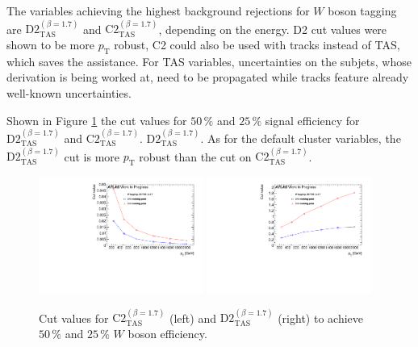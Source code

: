The variables achieving the highest background rejections for $W$ boson tagging are $\text{D2}_{\text{TAS}}^{(\beta=1.7)}$ and $\text{C2}_{\text{TAS}}^{(\beta=1.7)}$, depending on the energy. D2 cut values were shown to be more $p_{\mathrm{T}}$ robust, C2 could also be used with tracks instead of TAS, which saves the assistance. For TAS variables, uncertainties on the subjets, whose derivation is being worked at, need to be propagated while tracks feature already well-known uncertainties.


Shown in Figure \ref{fig:w_cut} the cut values for $50\,\%$ and $25\,\%$ signal efficiency for $\text{D2}_{\text{TAS}}^{(\beta=1.7)}$ and $\text{C2}_{\text{TAS}}^{(\beta=1.7)}$. $\text{D2}_{\text{TAS}}^{(\beta=1.7)}$. As for the default cluster variables, the $\text{D2}_{\text{TAS}}^{(\beta=1.7)}$ cut is more $p_{\mathrm{T}}$ robust than the cut on $\text{C2}_{\text{TAS}}^{(\beta=1.7)}$. 
\begin{figure}
\includegraphics[width=0.48\textwidth]{sascha_input/plots/W/cut_value/c2_tas17.pdf} \hspace{1mm}
\includegraphics[width=0.48\textwidth]{sascha_input/plots/W/cut_value/d2_tas17.pdf}	
\caption{{Cut values for $\text{C2}_{\text{TAS}}^{(\beta=1.7)}$ (left) and $\text{D2}_{\text{TAS}}^{(\beta=1.7)}$ (right) to achieve $50\,\%$ and $25\,\%$ $W$ boson efficiency.}}\label{fig:w_cut}
\end{figure}

